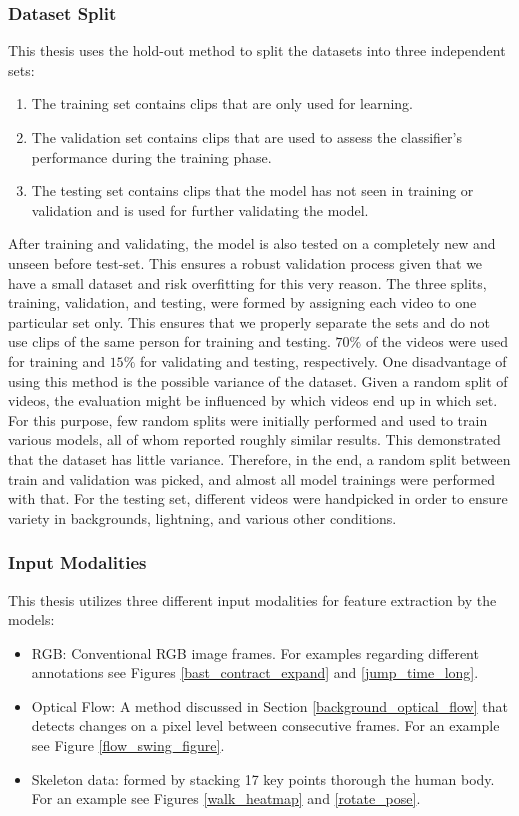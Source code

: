 \documentclass[extern,palatino]{cgMA}
\begin{document}
\subsubsection{Dataset Split} 

This thesis uses the hold-out method to split the datasets \cite{yadav2016analysis} into three independent sets:

\begin{enumerate}
    \item The training set contains clips that are only used for learning.
    \item The validation set contains clips that are used to assess the classifier's performance during the training phase.
    \item The testing set contains clips that the model has not seen in training or validation and is used for further validating the model.
\end{enumerate}

\noindent After training and validating, the model is also tested on a completely new and unseen before test-set. This ensures a robust validation process given that we have a small dataset and risk overfitting for this very reason. The three splits, training, validation, and testing, were formed by assigning each video to one particular set only. This ensures that we properly separate the sets and do not use clips of the same person for training and testing. $70\%$ of the videos were used for training and $15\%$ for validating and testing, respectively. One disadvantage of using this method is the possible variance of the dataset. Given a random split of videos, the evaluation might be influenced by which videos end up in which set. For this purpose, few random splits were initially performed and used to train various models, all of whom reported roughly similar results. This demonstrated that the dataset has little variance. Therefore, in the end, a random split between train and validation was picked, and almost all model trainings were performed with that. For the testing set, different videos were handpicked in order to ensure variety in backgrounds, lightning, and various other conditions.

\subsubsection{Input Modalities} This thesis utilizes three different input modalities for feature extraction by the models: 

\begin{itemize}
    \item RGB: Conventional RGB image frames. For examples regarding different annotations see Figures \ref{bast_contract_expand} and \ref{jump_time_long}.
    \item Optical Flow: A method discussed in Section \ref{background_optical_flow} that detects changes on a pixel level between consecutive frames. For an example see Figure \ref{flow_swing_figure}.
    \item Skeleton data: formed by stacking 17 key points thorough the human body. For an example see Figures \ref{walk_heatmap} and \ref{rotate_pose}.
\end{itemize}
\end{document}
